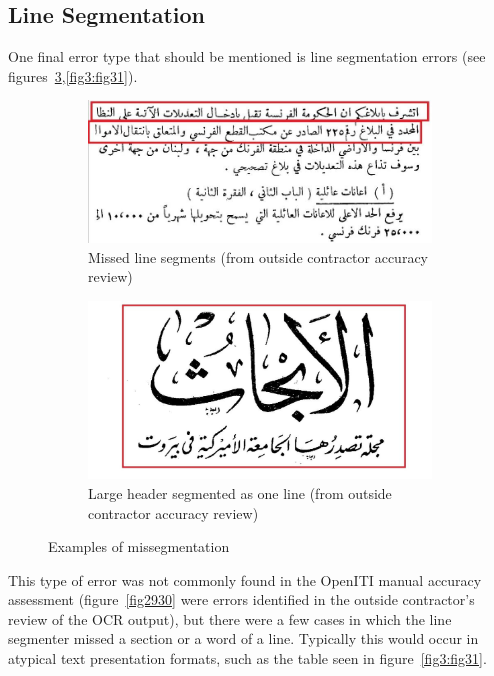\subsection{Line Segmentation}

One final error type that should be mentioned is line segmentation errors (see
figures~\ref{fig3:fig2930},\ref{fig3:fig31}). 

\begin{figure}[h]
	\centering
	\begin{subfigure}[b]{0.45\linewidth}
	\centering
	\includegraphics[width=\textwidth]{images/image16.jpg}
	\caption{Missed line segments (from outside contractor accuracy review)}
	\label{fig3:fig29}
	\end{subfigure}
	\begin{subfigure}[b]{0.45\linewidth}
	\centering
	\includegraphics[width=\textwidth]{images/image17.jpg}
	\caption{Large header segmented as one line (from outside contractor accuracy review)}
	\label{fig3:fig30}
	\end{subfigure}
	\caption{Examples of missegmentation}
	\label{fig3:fig2930}
\end{figure} 

This type of error was not commonly found in the OpenITI manual accuracy
assessment (figure~\ref{fig2930} were errors identified in the outside contractor’s
review of the OCR output), but there were a few cases in which the line
segmenter missed a section or a word of a line. Typically this would occur in
atypical text presentation formats, such as the table seen in figure~\ref{fig3:fig31}.

